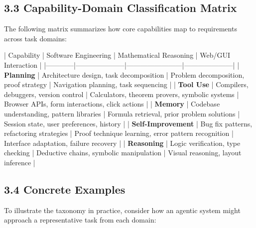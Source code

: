 \subsection{3.3 Capability-Domain Classification Matrix}

The following matrix summarizes how core capabilities map to requirements across task domains:

| Capability | Software Engineering | Mathematical Reasoning | Web/GUI Interaction |
|------------|---------------------|------------------------|---------------------|
| \textbf{Planning} | Architecture design, task decomposition | Problem decomposition, proof strategy | Navigation planning, task sequencing |
| \textbf{Tool Use} | Compilers, debuggers, version control | Calculators, theorem provers, symbolic systems | Browser APIs, form interactions, click actions |
| \textbf{Memory} | Codebase understanding, pattern libraries | Formula retrieval, prior problem solutions | Session state, user preferences, history |
| \textbf{Self-Improvement} | Bug fix patterns, refactoring strategies | Proof technique learning, error pattern recognition | Interface adaptation, failure recovery |
| \textbf{Reasoning} | Logic verification, type checking | Deductive chains, symbolic manipulation | Visual reasoning, layout inference |

\subsection{3.4 Concrete Examples}

To illustrate the taxonomy in practice, consider how an agentic system might approach a representative task from each domain:

